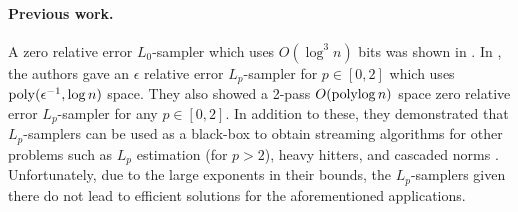 \paragraph{Previous work.} 
A zero relative error $L_0$-sampler which uses $O(\log^3 n)$ bits was shown in \cite{FrahlingIS05}. 
In \cite{MonemizadehW10}, the authors gave an $\epsilon$ relative error
$L_p$-sampler for $p \in [0,2]$ which uses $\operatorname{poly}(\epsilon^{-1},\log n)$ space. They also showed 
  a 2-pass $O(\operatorname{polylog} n)$ space zero relative error $L_p$-sampler for any $p\in [0,2]$. In addition
  to these, they demonstrated that $L_p$-samplers can be used as a black-box to obtain
   streaming algorithms for other problems such as $L_p$ estimation (for $p >2$), heavy hitters, 
   and cascaded norms \cite{JayramW09}.
   Unfortunately, due to the large exponents in their bounds, the
  $L_p$-samplers given there do not lead to efficient solutions for the aforementioned applications.
  
